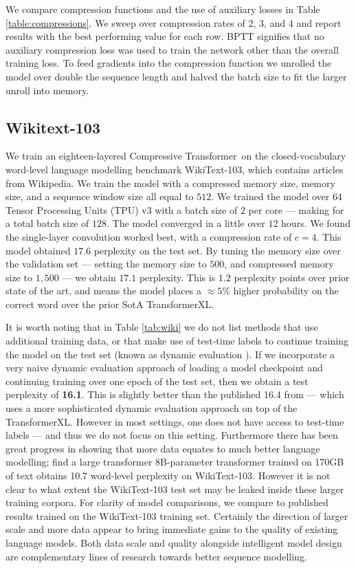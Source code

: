 We compare compression functions and the use of auxiliary losses in Table \ref{table:compressions}. We sweep over compression rates of $2$, $3$, and $4$ and report results with the best performing value for each row. BPTT signifies that no auxiliary compression loss was used to train the network other than the overall training loss. To feed gradients into the compression function we unrolled the model over double the sequence length and halved the batch size to fit the larger unroll into memory.

\subsection{Wikitext-103}
We train an eighteen-layered Compressive Transformer~on the closed-vocabulary word-level language modelling benchmark WikiText-103, which contains articles from Wikipedia. We train the model with a compressed memory size, memory size, and a sequence window size all equal to $512$. We trained the model over $64$ Tensor Processing Units (TPU) v3 with a batch size of $2$ per core --- making for a total batch size of $128$. The model converged in a little over $12$ hours. We found the single-layer convolution worked best, with a compression rate of $c=4$. This model obtained $17.6$ perplexity on the test set. By tuning the memory size over the validation set --- setting the memory size to $500$, and compressed memory size to $1,500$ --- we obtain $17.1$ perplexity. This is $1.2$ perplexity points over prior state of the art, and means the model places a $\approx 5\%$ higher probability on the correct word over the prior SotA TransformerXL.

It is worth noting that in Table \ref{tab:wiki} we do not list methods that use additional training data, or that make use of test-time labels to continue training the model on the test set (known as dynamic evaluation \citep{graves2013generating}). If we incorporate a very naive dynamic evaluation approach of loading a model checkpoint and continuing training over one epoch of the test set, then we obtain a test perplexity of \textbf{16.1}. This is slightly better than the published 16.4 from \cite{krause2019dynamic} --- which uses a more sophisticated dynamic evaluation approach on top of the TransformerXL. However in most settings, one does not have access to test-time labels --- and thus we do not focus on this setting. Furthermore there has been great progress in showing that more data equates to much better language modelling; \cite{shoeybi2019megatronlm} find a large transformer 8B-parameter transformer trained on 170GB of text obtains 10.7 word-level perplexity on WikiText-103. However it is not clear to what extent the WikiText-103 test set may be leaked inside these larger training corpora. For clarity of model comparisons, we compare to published results trained on the WikiText-103 training set. Certainly the direction of larger scale and more data appear to bring immediate gains to the quality of existing language models. Both data scale and quality alongside intelligent model design are complementary lines of research towards better sequence modelling.

